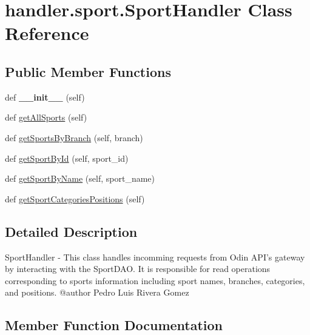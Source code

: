 \hypertarget{classhandler_1_1sport_1_1_sport_handler}{}\section{handler.\+sport.\+Sport\+Handler Class Reference}
\label{classhandler_1_1sport_1_1_sport_handler}
\subsection*{Public Member Functions}
\begin{DoxyCompactItemize}
\item 
\mbox{\label{classhandler_1_1sport_1_1_sport_handler_a72e5a6d4eb4f625284bd3fc8a19e54f9}} 
def {\bfseries \+\_\+\+\_\+init\+\_\+\+\_\+} (self)
\item 
def \hyperlink{classhandler_1_1sport_1_1_sport_handler_a8bdc68a2a00be3fc4c66b75aea4abbc3}{get\+All\+Sports} (self)
\item 
def \hyperlink{classhandler_1_1sport_1_1_sport_handler_a5cd67d66c4b722c46da490fe63beff74}{get\+Sports\+By\+Branch} (self, branch)
\item 
def \hyperlink{classhandler_1_1sport_1_1_sport_handler_a18849851d8f9daf78e2e879ac9806a20}{get\+Sport\+By\+Id} (self, sport\+\_\+id)
\item 
def \hyperlink{classhandler_1_1sport_1_1_sport_handler_ad7fbc2c9ab7563cc23ca0b5a3d4820ab}{get\+Sport\+By\+Name} (self, sport\+\_\+name)
\item 
def \hyperlink{classhandler_1_1sport_1_1_sport_handler_ad83c6e5db6358cf97f46b04135100c53}{get\+Sport\+Categories\+Positions} (self)
\end{DoxyCompactItemize}


\subsection{Detailed Description}
\begin{DoxyVerb}SportHandler - This class handles incomming requests from Odin API's gateway
               by interacting with the SportDAO. It is responsible for read
               operations corresponding to sports information including 
               sport names, branches, categories, and positions.
@author Pedro Luis Rivera Gomez
\end{DoxyVerb}
 

\subsection{Member Function Documentation}
\mbox{\label{classhandler_1_1sport_1_1_sport_handler_a8bdc68a2a00be3fc4c66b75aea4abbc3}} 
